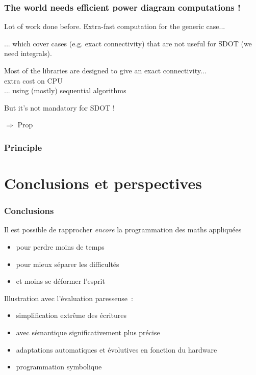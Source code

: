 \documentclass[aspectratio=169]{beamer}
\begin{document}
\begin{frame}
    \frametitle{The world needs efficient power diagram computations !}

    Lot of work done before. Extra-fast computation for the generic case...

    ... which cover cases (e.g. exact connectivity) that are not useful for SDOT (we need integrals).
    
    Most of the libraries are designed to give an exact connectivity...
        \\{\hfill extra cost on CPU}
        \\{\hfill ... using (mostly) sequential algorithms}
    
    \vfill
    But it's not mandatory for SDOT !
    
    
    \vfill
    $\Rightarrow$ Prop
\end{frame}



\begin{frame}
    \frametitle{Principle}

\end{frame}


\begin{frame}
    \frametitle{}

\end{frame}


 
\section{Conclusions et perspectives}

\begin{frame}
    \frametitle{Conclusions}

    Il est possible de rapprocher \textit{encore} la programmation des maths appliquées
    \begin{itemize}
        \item pour perdre moins de temps
        \item pour mieux séparer les difficultés
        \item et moins se déformer l'esprit
    \end{itemize}
    
    \vfill
    Illustration avec l'évaluation paresseuse~: 
    \begin{itemize}
        \item simplification extrême des écritures 
        \item avec sémantique significativement plus précise
        \item adaptations automatiques et évolutives en fonction du hardware
        \item programmation symbolique
    \end{itemize}
\end{frame}
\end{document}
